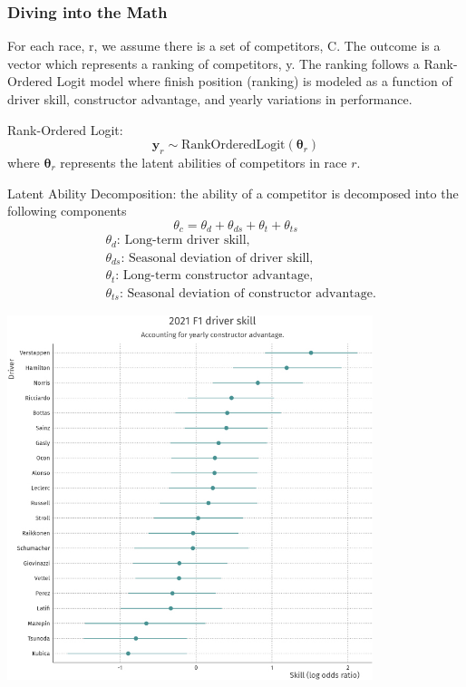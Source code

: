 \documentclass[12pt]{article}
\begin{document}
\subsubsection{Diving into the Math}
For each race, r, we assume there is a set of competitors, C. The outcome is a vector which 
represents a ranking of competitors, y. The ranking follows a Rank-Ordered Logit model where 
finish position (ranking) is modeled as a function of driver skill, constructor advantage, and 
yearly variations in performance.

Rank-Ordered Logit:
\[
\mathbf{y}_r \sim \text{RankOrderedLogit}(\boldsymbol{\theta}_r)
\]
where \(\boldsymbol{\theta}_r\) represents the latent abilities of competitors in race \(r\).

Latent Ability Decomposition: 
the ability of a competitor is decomposed into the following components
\[
\theta_c = \theta_d + \theta_{ds} + \theta_t + \theta_{ts}
\]
\[
\begin{aligned}
&\theta_d \text{: Long-term driver skill,} \\
&\theta_{ds} \text{: Seasonal deviation of driver skill,} \\
&\theta_t \text{: Long-term constructor advantage,} \\
&\theta_{ts} \text{: Seasonal deviation of constructor advantage.}
\end{aligned}
\]



\begin{center}
    \includegraphics[width=0.8\textwidth]{driver skill.jpg}
    \end{center}
\end{document}
